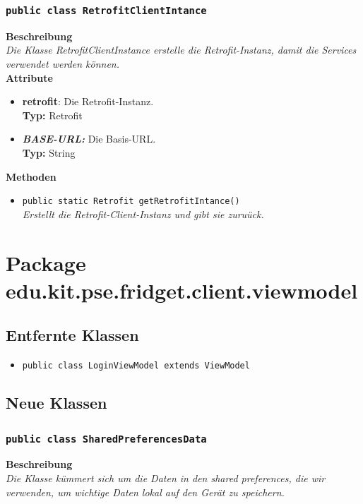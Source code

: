 \documentclass[a4paper]{scrreprt}
\begin{document}
	\subsubsection{\texttt{public class RetrofitClientIntance}}
	\textbf{Beschreibung} \\
	\textit{Die Klasse RetrofitClientInstance erstelle die Retrofit-Instanz, damit die Services verwendet werden können.} \\
	
	\textbf{Attribute}
	\begin{itemize}
		\item \textbf{retrofit}: Die Retrofit-Instanz. \\
		\textbf{Typ:} Retrofit
		
		\item \textbf\textit{{BASE-URL:}} Die Basis-URL. \\
		\textbf{Typ:} String
	\end{itemize}
	\textbf{Methoden}
	\begin{itemize}
		\item{\texttt{public static Retrofit getRetrofitIntance()}}\\
		\textit{Erstellt die Retrofit-Client-Instanz und gibt sie zuruück.}\\
	\end{itemize}
	
	\section{Package edu.kit.pse.fridget.client.viewmodel}
	\subsection{Entfernte Klassen}
	\begin{itemize}
		\item \texttt{public class LoginViewModel extends ViewModel}
	\end{itemize}
	\subsection{Neue Klassen}
	\subsubsection{\texttt{public class SharedPreferencesData}}
	\textbf{Beschreibung} \\
	\textit{Die Klasse kümmert sich um die Daten in den shared preferences, die wir verwenden, um wichtige Daten lokal auf den Gerät zu speichern.} \\
	
\end{document}
